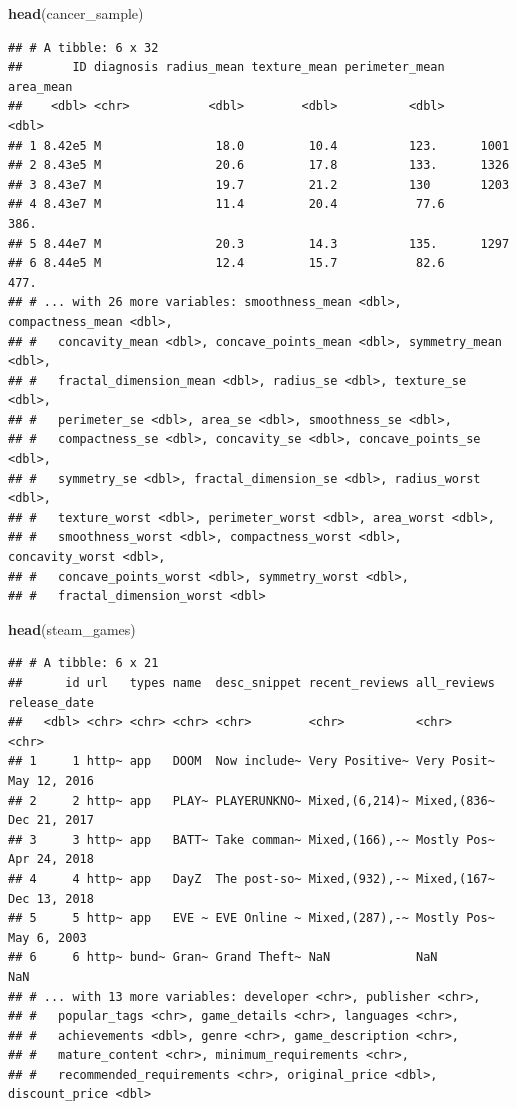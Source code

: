 \documentclass[
]{article}
\newenvironment{Shaded}{\begin{snugshade}}{\end{snugshade}}
\newcommand{\KeywordTok}[1]{\textcolor[rgb]{0.13,0.29,0.53}{\textbf{#1}}}
\newcommand{\NormalTok}[1]{#1}
\begin{document}
\begin{Shaded}
\begin{Highlighting}[]
\KeywordTok{head}\NormalTok{(cancer\_sample)}
\end{Highlighting}
\end{Shaded}

\begin{verbatim}
## # A tibble: 6 x 32
##       ID diagnosis radius_mean texture_mean perimeter_mean area_mean
##    <dbl> <chr>           <dbl>        <dbl>          <dbl>     <dbl>
## 1 8.42e5 M                18.0         10.4          123.      1001 
## 2 8.43e5 M                20.6         17.8          133.      1326 
## 3 8.43e7 M                19.7         21.2          130       1203 
## 4 8.43e7 M                11.4         20.4           77.6      386.
## 5 8.44e7 M                20.3         14.3          135.      1297 
## 6 8.44e5 M                12.4         15.7           82.6      477.
## # ... with 26 more variables: smoothness_mean <dbl>, compactness_mean <dbl>,
## #   concavity_mean <dbl>, concave_points_mean <dbl>, symmetry_mean <dbl>,
## #   fractal_dimension_mean <dbl>, radius_se <dbl>, texture_se <dbl>,
## #   perimeter_se <dbl>, area_se <dbl>, smoothness_se <dbl>,
## #   compactness_se <dbl>, concavity_se <dbl>, concave_points_se <dbl>,
## #   symmetry_se <dbl>, fractal_dimension_se <dbl>, radius_worst <dbl>,
## #   texture_worst <dbl>, perimeter_worst <dbl>, area_worst <dbl>,
## #   smoothness_worst <dbl>, compactness_worst <dbl>, concavity_worst <dbl>,
## #   concave_points_worst <dbl>, symmetry_worst <dbl>,
## #   fractal_dimension_worst <dbl>
\end{verbatim}

\begin{Shaded}
\begin{Highlighting}[]
\KeywordTok{head}\NormalTok{(steam\_games)}
\end{Highlighting}
\end{Shaded}

\begin{verbatim}
## # A tibble: 6 x 21
##      id url   types name  desc_snippet recent_reviews all_reviews release_date
##   <dbl> <chr> <chr> <chr> <chr>        <chr>          <chr>       <chr>       
## 1     1 http~ app   DOOM  Now include~ Very Positive~ Very Posit~ May 12, 2016
## 2     2 http~ app   PLAY~ PLAYERUNKNO~ Mixed,(6,214)~ Mixed,(836~ Dec 21, 2017
## 3     3 http~ app   BATT~ Take comman~ Mixed,(166),-~ Mostly Pos~ Apr 24, 2018
## 4     4 http~ app   DayZ  The post-so~ Mixed,(932),-~ Mixed,(167~ Dec 13, 2018
## 5     5 http~ app   EVE ~ EVE Online ~ Mixed,(287),-~ Mostly Pos~ May 6, 2003 
## 6     6 http~ bund~ Gran~ Grand Theft~ NaN            NaN         NaN         
## # ... with 13 more variables: developer <chr>, publisher <chr>,
## #   popular_tags <chr>, game_details <chr>, languages <chr>,
## #   achievements <dbl>, genre <chr>, game_description <chr>,
## #   mature_content <chr>, minimum_requirements <chr>,
## #   recommended_requirements <chr>, original_price <dbl>, discount_price <dbl>
\end{verbatim}
\end{document}
